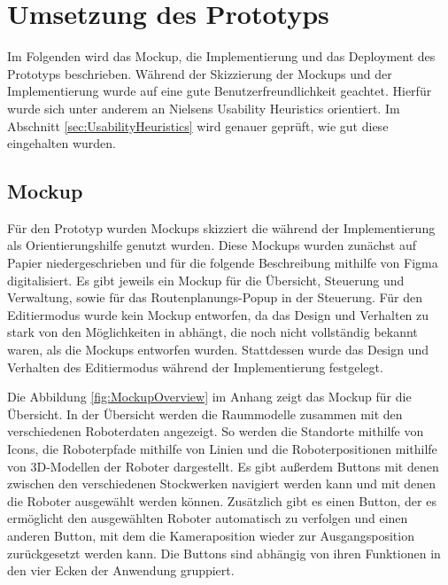 
\newpage
\section{Umsetzung des Prototyps}\label{sec:RealizationOfPrototype}
Im Folgenden wird das \gls{Mockup}, die Implementierung und das Deployment des Prototyps beschrieben. Während der Skizzierung der \gls{Mockup}s und der Implementierung wurde auf eine gute Benutzerfreundlichkeit geachtet. Hierfür wurde sich unter anderem an Nielsens Usability Heuristics \cite{Nielsen.1994} orientiert. Im Abschnitt \ref{sec:UsabilityHeuristics} wird genauer geprüft, wie gut diese eingehalten wurden.

\subsection{Mockup}\label{sec:Mockup}
Für den Prototyp wurden \gls{Mockup}s skizziert die während der Implementierung als Orientierungshilfe genutzt wurden. Diese \gls{Mockup}s wurden zunächst auf Papier niedergeschrieben und für die folgende Beschreibung mithilfe von Figma \cite{Figma} digitalisiert. Es gibt jeweils ein \gls{Mockup} für die Übersicht, Steuerung und Verwaltung, sowie für das Routenplanungs-Popup in der Steuerung. Für den Editiermodus wurde kein \gls{Mockup} entworfen, da das Design und Verhalten zu stark von den Möglichkeiten in \deckgl{} abhängt, die noch nicht vollständig bekannt waren, als die \gls{Mockup}s entworfen wurden. Stattdessen wurde das Design und Verhalten des Editiermodus während der Implementierung festgelegt.

Die Abbildung \ref{fig:MockupOverview} im Anhang zeigt das \gls{Mockup} für die Übersicht. In der Übersicht werden die Raummodelle zusammen mit den verschiedenen Roboterdaten angezeigt. So werden die Standorte mithilfe von Icons, die Roboterpfade mithilfe von Linien und die Roboterpositionen mithilfe von 3D-Modellen der Roboter dargestellt. Es gibt außerdem Buttons mit denen zwischen den verschiedenen Stockwerken navigiert werden kann und mit denen die Roboter ausgewählt werden können. Zusätzlich gibt es einen Button, der es ermöglicht den ausgewählten Roboter automatisch zu verfolgen und einen anderen Button, mit dem die Kameraposition wieder zur Ausgangsposition zurückgesetzt werden kann. Die Buttons sind abhängig von ihren Funktionen in den vier Ecken der Anwendung gruppiert.

